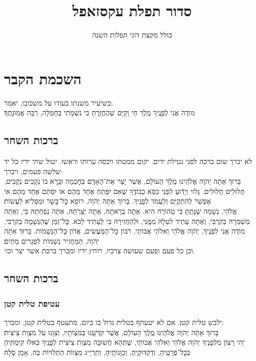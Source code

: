 \documentclass[12pt,letterpaper]{siddur}
\title{סדור תפלת עקסזאפל}
\subtitle{כולל מקצת דוגי תפלות השנה}
\begin{document}
\maketitle
\frontmatter
\tableofcontents
\mainmatter
\chapter{השכמת הקבר}
\scriptsize{\textsf{כשיעיר משנתו בעודו על משכובו, יאמר:}}\\\normalsize
מוֹדֶה אֲנִי לְפָנֶֽיךָ מֶֽלֶךְ חַי וְקַיָּם שֶׁהֶחֱזַֽרְתָּ בִּי נִשְׁמָתִי בְּחֶמְלָה, רַבָּה אֱמוּנָתֶֽךָ׃
\section{ברכות השחר}
\scriptsize{\textsf{לא יברך שום ברכה לפני נטילת ידים. יקום ממטתו ויכסה ערותו וראשו. יטול שתי ידיו כל יד שלשה פעמים, ויברך:}}\normalsize\\
בָּרוּךְ אַתָּה יְהֹוָה אֱלֹהֵֽינוּ מֶֽלֶךְ הָעוֹלָם, אֲשֶׁר יָצַר אֶת־הָאָדָם בְּחׇכְמָה וּבָֽרָא בוֹ נְקָבִים נְקָבִים, חֲלוּלִים חֲלוּלִים. גָּלוּי וְיָדֽֿוּעַ לִפְנֵי כִסֵּא כְבוֹדֶֽךָ שֶׁאִם יִפָּתֵֽחַ אֶחָד מֵהֶם אוֹ יִסָּתֵם אֶחָד מֵהֶם אִי אֶפְשַׁר לְהִתְקַיֵּם וְלַעֲמֹד לְפָנֶֽיךָ. בָּרוּךְ אַתָּה יְהֹוָה, רוֹפֵא כׇל־בָּשָׂר וּמַפְלִיא לַעֲשׂוֹת׃\\
אֱלֹהַי, נְשָׁמָה שֶׁנָּתַֽתָּ בִּי טְהוֹרָה הִיא. אַתָּה בְרָאתָהּ, אַתָּה יְצַרְתָּהּ, אַתָּה נְפַחְתָּהּ בִּי, וְאַתָּה מְשַׁמְּרָהּ בְּקִרְבִּי, וְאַתָּה עָתִיד לִטְּלָהּ מִמֶּֽנִּי, וּלְהַחֲזִירָהּ בִּי לֶעָתִיד לָבֹא. כׇּל־זְמַן שֶׁהַנְּשָׁמָה בְקִרְבִּי, מוֹדֶה אֲנִי לְפָנֶֽיךָ, יְהֹוָה אֱלֹהַי וֵאלֹהֵי אֲבוֹתַי, רִבּוֹן כׇּל־הַמַּעֲשִׂים, אֲדוֹן כׇּל־הַנְּשָׁמוֹת. בָּרוּךְ אַתָּה יְהֹוָה, הַמַּחֲזִיר נְשָׁמוֹת לִפְגָרִים מֵתִים׃\\
\scriptsize{\textsf{וכן כל פעם ופעם שעושה צרכיו, רוחץ ידיו ומברך ברכת אשר יצר וכו׳.}}\normalsize
\section{ברכות השחר}
\subsection{עטיפת טלית קטן}
\scriptsize{\textsf{ילבש טלית קטן. אם לא יטעתף בטלית גדול בו ביום, מתעטף בטלית קטן, ומברך:}}\normalsize\\
בָּרוּךְ אַתָּה יְהֹוָה אֱלֹהֵֽינוּ מֶֽלֶךְ הָעוֹלָם, אֲשֶׁר קִדְּשָֽׁנוּ בְּמִצְוֹתָיו, וְצִוָּנוּ עַל מִצְוַת צִיצִית׃\smallskip\\
יְהִי רָצוֹן מִלְּפָנֶיךָ יְהֹוָה אֱלֹהַי וֵאלֹהֵי אֲבוֹתַי, שֶׁתְּהֵא חֲשׁוּבָה מִצְוַת צִיצִית לְפָנֶֽיךָ כְּאִלּוּ קִיַּמְתִּֽיהָ בְּכׇל־פְּרָטֶֽיהָ, וְדִקְדּוּקֶֽיהָ, וְכַוָּנוֹתֶֽיהָ, וְתַרְיַ״ג מִצְווֹת הַתְּלוּיוֹת בָּהּ, אָמֵן סֶלָה׃
\end{document}
